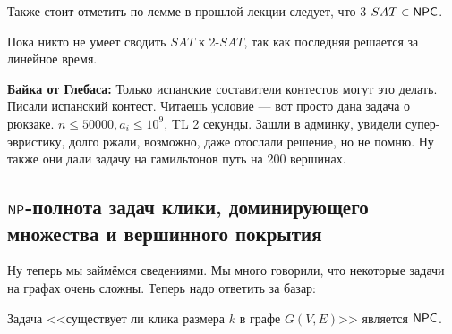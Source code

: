 \documentclass[a4paper, 12pt]{article}
\begin{document}
Также стоит отметить по лемме в прошлой лекции следует, что 3-$SAT \in \mathsf{NPC}$.

Пока никто не умеет сводить $SAT$ к 2-$SAT$, так как последняя решается за
линейное время.

{\bf Байка от Глебаса:} Только испанские составители контестов могут 
это делать. Писали испанский контест. 
Читаешь условие --- вот просто дана задача о рюкзаке. 
$n \leqslant 50000,  a_i \leqslant 10^9$, TL 2 секунды.
Зашли в админку, увидели супер-эвристику, долго ржали, возможно, даже отослали 
решение, но не помню. Ну также они дали задачу на гамильтонов путь на 200 вершинах.

\subsection{$\mathsf{NP}$-полнота задач клики, доминирующего множества и вершинного
покрытия}

Ну теперь мы займёмся сведениями. Мы много говорили, что некоторые задачи на
графах очень сложны. Теперь надо ответить за базар:

\begin{Theorem}
  Задача <<существует ли клика размера $k$ в графе $G(V, E)$>> является $\mathsf{NPC}$.
\end{Theorem}
\end{document}
